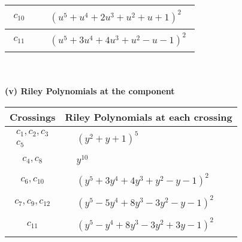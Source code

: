 \documentclass[1p]{elsarticle_modified}
\theoremstyle{definition}
\begin{document}
\begin{tabular}{m{50pt}|m{274pt}}
\hline $$\begin{aligned}c_{10}\end{aligned}$$&$\begin{aligned}
&(u^5+u^4+2 u^3+u^2+u+1)^2
\end{aligned}$\\
\hline $$\begin{aligned}c_{11}\end{aligned}$$&$\begin{aligned}
&(u^5+3 u^4+4 u^3+u^2- u-1)^2
\end{aligned}$\\
\hline
\end{tabular}\\~\\
\newpage\renewcommand{\arraystretch}{1}
\flushleft \textbf{(v) Riley Polynomials at the component}\newline \\
\begin{tabular}{m{50pt}|m{274pt}}
Crossings & \hspace{64pt}Riley Polynomials at each crossing \\
\hline $$\begin{aligned}c_{1},c_{2},c_{3}\\c_{5}\end{aligned}$$&$\begin{aligned}
&(y^2+y+1)^5
\end{aligned}$\\
\hline $$\begin{aligned}c_{4},c_{8}\end{aligned}$$&$\begin{aligned}
&y^{10}
\end{aligned}$\\
\hline $$\begin{aligned}c_{6},c_{10}\end{aligned}$$&$\begin{aligned}
&(y^5+3 y^4+4 y^3+y^2- y-1)^2
\end{aligned}$\\
\hline $$\begin{aligned}c_{7},c_{9},c_{12}\end{aligned}$$&$\begin{aligned}
&(y^5-5 y^4+8 y^3-3 y^2- y-1)^2
\end{aligned}$\\
\hline $$\begin{aligned}c_{11}\end{aligned}$$&$\begin{aligned}
&(y^5- y^4+8 y^3-3 y^2+3 y-1)^2
\end{aligned}$\\
\hline
\end{tabular}\\~\\
\end{document}
